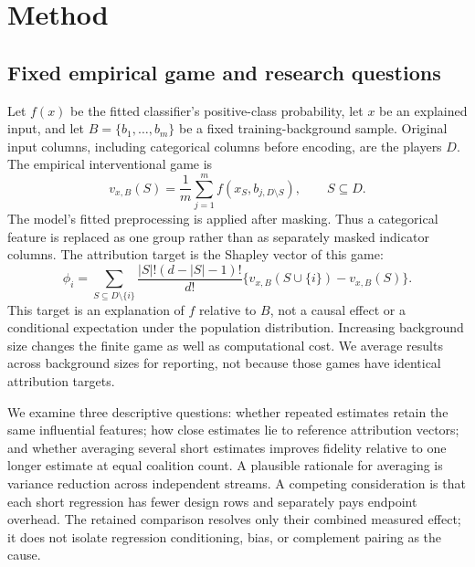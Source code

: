 \documentclass{article}
\begin{document}
\section{Method}
\subsection{Fixed empirical game and research questions}
Let $f(x)$ be the fitted classifier's positive-class probability, let $x$ be an explained input, and let $B=\{b_1,\ldots,b_m\}$ be a fixed training-background sample. Original input columns, including categorical columns before encoding, are the players $D$. The empirical interventional game is
\begin{equation}
v_{x,B}(S)=\frac{1}{m}\sum_{j=1}^{m} f(x_S,b_{j,D\setminus S}),\qquad S\subseteq D.
\label{eq:game}
\end{equation}
The model's fitted preprocessing is applied after masking. Thus a categorical feature is replaced as one group rather than as separately masked indicator columns. The attribution target is the Shapley vector of this game:
\begin{equation}
\phi_i=\sum_{S\subseteq D\setminus\{i\}}
\frac{|S|!(d-|S|-1)!}{d!}\{v_{x,B}(S\cup\{i\})-v_{x,B}(S)\}.
\label{eq:shapley}
\end{equation}
This target is an explanation of $f$ relative to $B$, not a causal effect or a conditional expectation under the population distribution. Increasing background size changes the finite game as well as computational cost. We average results across background sizes for reporting, not because those games have identical attribution targets.

We examine three descriptive questions: whether repeated estimates retain the same influential features; how close estimates lie to reference attribution vectors; and whether averaging several short estimates improves fidelity relative to one longer estimate at equal coalition count. A plausible rationale for averaging is variance reduction across independent streams. A competing consideration is that each short regression has fewer design rows and separately pays endpoint overhead. The retained comparison resolves only their combined measured effect; it does not isolate regression conditioning, bias, or complement pairing as the cause.
\end{document}

